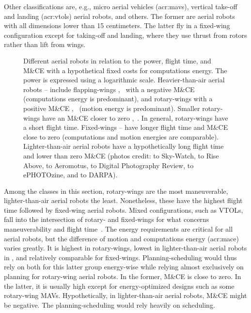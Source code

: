 Other classifications are, e.g., micro aerial vehicles (\Gls{acr:mav}s), vertical take-off and landing (\Gls{acr:vtol}s) aerial robots, and others. The former are aerial robots with all dimensions lower than 15 centimeters. The latter fly in a fixed-wing configuration except for taking-off and landing, where they use thrust from rotors rather than lift from wings.

\begin{figure}[p!]
  \centering
  \footnotesize{}\selectfont
  
  \vspace*{36pt}
  \caption[Different aerial robots in relation to the power, flight time, and M\&CE]{Different aerial robots in relation to the power, flight time, and M\&CE with a hypothetical fixed costs for computations energy. The power is expressed using a logarithmic scale. Heavier-than-air aerial robots -- include flapping-wings ,~ with a negative M\&CE (computations energy is predominant), and rotary-wings with a positive M\&CE ,~ (motion energy is predominant). Smaller rotary-wings have an M\&CE closer to zero ,~. In general, rotary-wings have a short flight time. Fixed-wings -- have longer flight time and M\&CE close to zero (computations and motion energies are comparable). Lighter-than-air aerial robots  have a hypothetically long flight time and lower than zero M\&CE {\scriptsize(photos credit:  to Sky-Watch,  to Rise Above,  to Aeromotus,  to Digital Photography Review,  to ePHOTOzine, and  to DARPA)}.}
  \label{fig:robots-vs-power}
\end{figure}

Among the classes in this section, rotary-wings are the most maneuverable, lighter-than-air aerial robots the least. Nonetheless, these have the highest flight time followed by fixed-wing aerial robots. Mixed configurations, such as VTOLs, fall into the intersection of rotary- and fixed-wings for what concerns maneuverability and flight time~\citep{siciliano2016springer}. The energy requirements are critical for all aerial robots, but the difference of motion and computations energy (\Gls{acr:mace}) varies greatly. It is highest in rotary-wings, lowest in lighter-than-air aerial robots in , and relatively comparable for fixed-wings. Planning-scheduling would thus rely on both for this latter group energy-wise while relying almost exclusively on planning for rotary-wing aerial robots. In the former, M\&CE is close to zero. In the latter, it is usually high except for energy-optimized designs such as some rotary-wing MAVs. Hypothetically, in lighter-than-air aerial robots, M\&CE might be negative. The planning-scheduling would rely heavily on scheduling.

